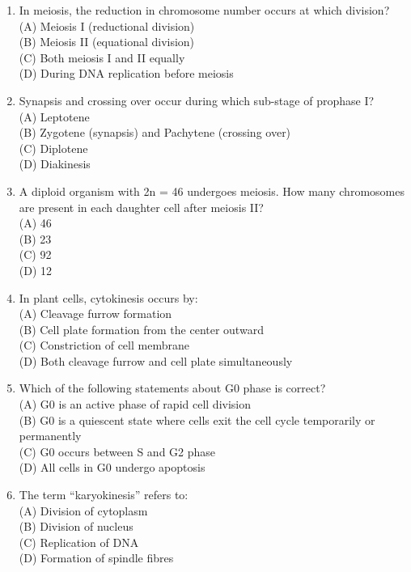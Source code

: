 \documentclass{article}
\begin{document}
\begin{enumerate}[label=Q\arabic*.]
\item In meiosis, the reduction in chromosome number occurs at which division?
\\(A) Meiosis I (reductional division)
\\(B) Meiosis II (equational division)
\\(C) Both meiosis I and II equally
\\(D) During DNA replication before meiosis

\item Synapsis and crossing over occur during which sub-stage of prophase I?
\\(A) Leptotene
\\(B) Zygotene (synapsis) and Pachytene (crossing over)
\\(C) Diplotene
\\(D) Diakinesis

\item A diploid organism with 2n = 46 undergoes meiosis. How many chromosomes are present in each daughter cell after meiosis II?
\\(A) 46
\\(B) 23
\\(C) 92
\\(D) 12

\item In plant cells, cytokinesis occurs by:
\\(A) Cleavage furrow formation
\\(B) Cell plate formation from the center outward
\\(C) Constriction of cell membrane
\\(D) Both cleavage furrow and cell plate simultaneously

\item Which of the following statements about G0 phase is correct?
\\(A) G0 is an active phase of rapid cell division
\\(B) G0 is a quiescent state where cells exit the cell cycle temporarily or permanently
\\(C) G0 occurs between S and G2 phase
\\(D) All cells in G0 undergo apoptosis

\item The term ``karyokinesis'' refers to:
\\(A) Division of cytoplasm
\\(B) Division of nucleus
\\(C) Replication of DNA
\\(D) Formation of spindle fibres


\end{enumerate}
\end{document}
